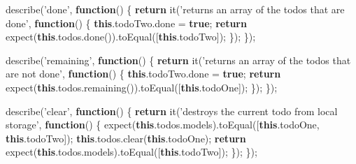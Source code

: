\documentclass[9pt]{book}
\newenvironment{Shaded}{}{}
\newcommand{\KeywordTok}[1]{\textcolor[rgb]{0.00,0.44,0.13}{\textbf{{#1}}}}
\newcommand{\StringTok}[1]{\textcolor[rgb]{0.25,0.44,0.63}{{#1}}}
\newcommand{\OtherTok}[1]{\textcolor[rgb]{0.00,0.44,0.13}{{#1}}}
\newcommand{\FunctionTok}[1]{\textcolor[rgb]{0.02,0.16,0.49}{{#1}}}
\newcommand{\NormalTok}[1]{{#1}}
\begin{document}
\begin{Shaded}
\begin{Highlighting}[]
    \FunctionTok{describe}\NormalTok{(}\StringTok{'done'}\NormalTok{, }\KeywordTok{function}\NormalTok{() \{}
      \KeywordTok{return} \FunctionTok{it}\NormalTok{(}\StringTok{'returns an array of the todos that are done'}\NormalTok{, }\KeywordTok{function}\NormalTok{() \{}
        \KeywordTok{this}\NormalTok{.}\OtherTok{todoTwo}\NormalTok{.}\FunctionTok{done} \NormalTok{= }\KeywordTok{true}\NormalTok{;}
        \KeywordTok{return} \FunctionTok{expect}\NormalTok{(}\KeywordTok{this}\NormalTok{.}\OtherTok{todos}\NormalTok{.}\FunctionTok{done}\NormalTok{()).}\FunctionTok{toEqual}\NormalTok{([}\KeywordTok{this}\NormalTok{.}\FunctionTok{todoTwo}\NormalTok{]);}
      \NormalTok{\});}
    \NormalTok{\});}

    \FunctionTok{describe}\NormalTok{(}\StringTok{'remaining'}\NormalTok{, }\KeywordTok{function}\NormalTok{() \{}
      \KeywordTok{return} \FunctionTok{it}\NormalTok{(}\StringTok{'returns an array of the todos that are not done'}\NormalTok{, }\KeywordTok{function}\NormalTok{() \{}
        \KeywordTok{this}\NormalTok{.}\OtherTok{todoTwo}\NormalTok{.}\FunctionTok{done} \NormalTok{= }\KeywordTok{true}\NormalTok{;}
        \KeywordTok{return} \FunctionTok{expect}\NormalTok{(}\KeywordTok{this}\NormalTok{.}\OtherTok{todos}\NormalTok{.}\FunctionTok{remaining}\NormalTok{()).}\FunctionTok{toEqual}\NormalTok{([}\KeywordTok{this}\NormalTok{.}\FunctionTok{todoOne}\NormalTok{]);}
      \NormalTok{\});}
    \NormalTok{\});}

    \FunctionTok{describe}\NormalTok{(}\StringTok{'clear'}\NormalTok{, }\KeywordTok{function}\NormalTok{() \{}
      \KeywordTok{return} \FunctionTok{it}\NormalTok{(}\StringTok{'destroys the current todo from local storage'}\NormalTok{, }\KeywordTok{function}\NormalTok{() \{}
        \FunctionTok{expect}\NormalTok{(}\KeywordTok{this}\NormalTok{.}\OtherTok{todos}\NormalTok{.}\FunctionTok{models}\NormalTok{).}\FunctionTok{toEqual}\NormalTok{([}\KeywordTok{this}\NormalTok{.}\FunctionTok{todoOne}\NormalTok{, }\KeywordTok{this}\NormalTok{.}\FunctionTok{todoTwo}\NormalTok{]);}
        \KeywordTok{this}\NormalTok{.}\OtherTok{todos}\NormalTok{.}\FunctionTok{clear}\NormalTok{(}\KeywordTok{this}\NormalTok{.}\FunctionTok{todoOne}\NormalTok{);}
        \KeywordTok{return} \FunctionTok{expect}\NormalTok{(}\KeywordTok{this}\NormalTok{.}\OtherTok{todos}\NormalTok{.}\FunctionTok{models}\NormalTok{).}\FunctionTok{toEqual}\NormalTok{([}\KeywordTok{this}\NormalTok{.}\FunctionTok{todoTwo}\NormalTok{]);}
      \NormalTok{\});}
    \NormalTok{\});}


\end{Highlighting}
\end{Shaded}
\end{document}
